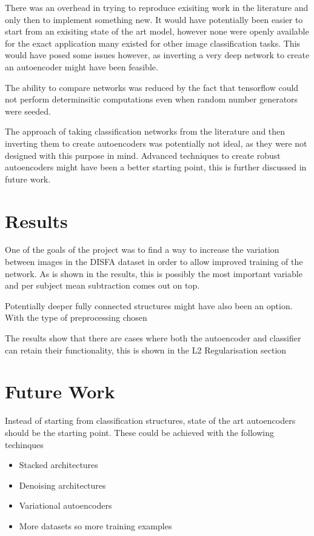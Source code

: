    There was an overhead in trying to reproduce exisiting work in the literature
    and only then to implement something new. It would have potentially been easier
    to start from an exisiting state of the art model, however none were openly available
    for the exact application many existed for other image classification tasks.
    This would have posed some issues however, as inverting a very deep network
    to create an autoencoder might have been feasible.

    The ability to compare networks was reduced by the fact that tensorflow could
    not perform determinsitic computations even when random number generators were
    seeded.

    The approach of taking classification networks from the literature and then
    inverting them to create autoencoders was potentially not ideal, as they
    were not designed with this purpose in mind. Advanced techniques to create robust
    autoencoders might have been a better starting point, this is further discussed in future work.



  \section{Results}
    One of the goals of the project was to find a way to increase the variation
    between images in the DISFA dataset in order to allow improved training of the network.
    As is shown in the results, this is possibly the most important variable and per subject mean subtraction
    comes out on top.


    Potentially deeper fully connected structures might have also been an option.
    With the type of preprocessing chosen


    The results show that there are cases where both the autoencoder and classifier can retain their functionality,
    this is shown in the L2 Regularisation section


  \section{Future Work}

    Instead of starting from classification structures, state of the art autoencoders
    should be the starting point. These could be achieved with the following techinques
    \begin{itemize}
      \item Stacked architectures
      \item Denoising architectures
      \item Variational autoencoders
      \item More datasets so more training examples
    \end{itemize}


